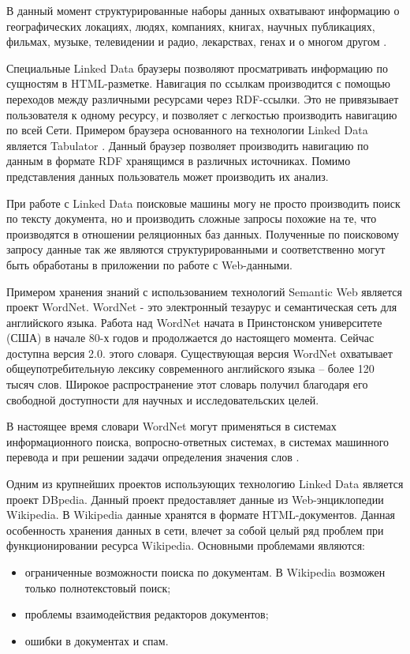 В данный момент структурированные наборы данных охватывают информацию о географических локациях, людях, компаниях, книгах, научных публикациях, фильмах, музыке, телевидении и радио, лекарствах, генах и о многом другом \cite{bizer2008linked}. 

Специальные Linked Data браузеры позволяют просматривать информацию по сущностям в HTML-разметке. Навигация по ссылкам производится с помощью переходов между различными ресурсами через RDF-ссылки. Это не привязывает пользователя к одному ресурсу, и позволяет с легкостью производить навигацию по всей Сети. Примером браузера основанного на технологии Linked Data является Tabulator \cite{berners2006tabulator}. Данный браузер позволяет производить навигацию по данным в формате RDF хранящимся в различных источниках. Помимо представления данных пользователь может производить их анализ.

При работе с Linked Data поисковые машины могу не просто производить поиск по тексту документа, но и производить сложные запросы похожие на те, что производятся в отношении реляционных баз данных. Полученные по поисковому запросу данные так же являются структурированными и соответственно могут быть обработаны в приложении по работе с Web-данными.

Примером хранения знаний с использованием технологий Semantic Web является проект WordNet. WordNet - это электронный тезаурус и семантическая сеть для английского языка. Работа над WordNet начата в Принстонском университете (США) в начале 80-х годов и продолжается до настоящего момента. Сейчас доступна версия 2.0. этого словаря. Существующая версия WordNet охватывает общеупотребительную лексику современного английского языка – более 120 тысяч слов. Широкое распространение этот словарь получил благодаря его свободной доступности для научных и исследовательских целей. 

В настоящее время словари WordNet могут применяться в системах информационного поиска, вопросно-ответных системах, в системах машинного перевода и при решении задачи определения значения слов \cite{suhonogov2004dev}.

Одним из крупнейших проектов использующих технологию Linked Data является проект DBpedia. Данный проект предоставляет данные из Web-энциклопедии Wikipedia. В Wikipedia данные хранятся в формате HTML-документов. Данная особенность хранения данных в сети, влечет за собой целый ряд проблем при функционировании ресурса Wikipedia. Основными проблемами являются:

\begin{itemize}
\item ограниченные возможности поиска по документам. В Wikipedia возможен только полнотекстовый поиск;
\item проблемы взаимодействия редакторов документов;
\item ошибки в документах и спам.
\end{itemize}

